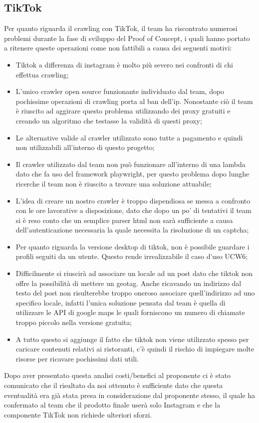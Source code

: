 \subsection{TikTok}
Per quanto riguarda il crawling con TikTok, il team ha riscontrato numerosi problemi durante la fase di sviluppo del Proof of Concept, i quali hanno portato a ritenere queste operazioni come non fattibili a causa dei seguenti motivi:
\begin{itemize}
    \item Tiktok a differenza di instagram è molto più severo nei confronti di chi effettua crawling;
    \item L'unico crawler open source funzionante individuato dal team, dopo pochissime operazioni di crawling porta al ban dell'ip. Nonostante ciò il team è riuscito ad aggirare questo problema utilizzando dei proxy gratuiti e creando un algoritmo che testasse la validità di questi proxy;
    \item Le alternative valide al crawler utilizzato sono tutte a pagamento e quindi non utilizzabili all'interno di questo progetto;
    \item Il crawler utilizzato dal team non può funzionare all'interno di una lambda dato che fa uso del framework playwright, per questo problema dopo lunghe ricerche il team non è riuscito a trovare una soluzione attuabile;
    \item L'idea di creare un nostro crawler è troppo dispendiosa se messa a confronto con le ore lavorative a disposizione, dato che dopo un po' di tentativi il team si è reso conto che un semplice parser html non sarà sufficiente a causa dell'autenticazione necessaria la quale necessita la risoluzione di un captcha;
    \item Per quanto riguarda la versione desktop di tiktok, non è possibile guardare i profili seguiti da un utente. Questo rende irrealizzabile il caso d'uso UCW6;
    \item Difficilmente si riuscirà ad associare un locale ad un post dato che tiktok non offre la possibilità di mettere un geotag. Anche ricavando un indirizzo dal testo del post non risulterebbe troppo oneroso associare quell'indirizzo ad uno specifico locale, infatti l'unica soluzione pensata dal team è quella di utilizzare le API di google maps le quali forniscono un numero di chiamate troppo piccolo nella versione gratuita;
    \item A tutto questo si aggiunge il fatto che tiktok non viene utilizzato spesso per caricare contenuti relativi ai ristoranti, c’è quindi il rischio di impiegare molte risorse per ricavare pochissimi dati utili.
\end{itemize}
Dopo aver presentato questa analisi costi/benefici al proponente ci è stato comunicato che il risultato da noi ottenuto è sufficiente dato che questa eventualità era già stata presa in considerazione dal proponente stesso, il quale ha confermato al team che il prodotto finale userà solo Instagram e che la componente TikTok non richiede ulteriori sforzi. 